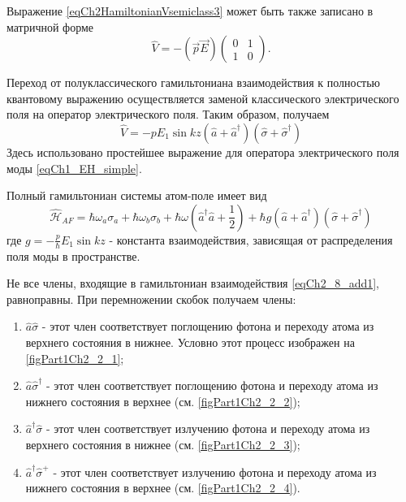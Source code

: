 Выражение \eqref{eqCh2HamiltonianVsemiclass3} может быть также
записано в матричной форме 
\begin{equation}
\hat{V} = - \left(\vec{p} \vec{E}\right)
\left(
\begin{array} {cc}
0 & 1  
\\
1 & 0 
\end{array}
\right).
\label{eqCh2_8}
\end{equation}

Переход от полуклассического гамильтониана взаимодействия к полностью
квантовому выражению осуществляется заменой классического
электрического поля на оператор электрического поля. Таким
образом, получаем 
\begin{equation}
\hat{V} = - p E_1 \sin k z \left(\hat{a} + \hat{a}^{\dag}\right)
\left(\hat{\sigma} + \hat{\sigma}^{\dag}\right)
\label{eqCh2_8_add1}
\end{equation}
Здесь использовано простейшее выражение для оператора электрического
поля моды \eqref{eqCh1_EH_simple}. 

Полный гамильтониан системы атом-поле имеет вид
\begin{equation}
\hat{\mathcal{H}}_{AF} = 
\hbar \omega_a \sigma_a + \hbar \omega_b \sigma_b +
\hbar \omega 
\left(\hat{a}^{\dag}\hat{a} + \frac{1}{2}\right)
+ \hbar g \left(\hat{a} + \hat{a}^{\dag}\right)
\left(\hat{\sigma} + \hat{\sigma}^{\dag}\right)
\nonumber
\end{equation}
где $g = -\frac{p}{\hbar}E_1 \sin k z$ - константа взаимодействия,
зависящая от распределения поля моды в пространстве.  










Не все члены, входящие в гамильтониан взаимодействия
\eqref{eqCh2_8_add1}, равноправны. При перемножении скобок получаем
члены: 
\begin{enumerate}
\item $\hat{a}\hat{\sigma}$ - этот член соответствует поглощению
  фотона и переходу атома из верхнего состояния в нижнее. Условно этот
  процесс изображен на \autoref{figPart1Ch2_2_1};  
\item $\hat{a}\hat{\sigma}^{\dag}$ - этот член соответствует поглощению
  фотона и переходу атома из нижнего состояния в верхнее (см. \autoref{figPart1Ch2_2_2});  
\item $\hat{a}^{\dag}\hat{\sigma}$ - этот член соответствует излучению
  фотона и переходу атома из верхнего состояния в нижнее (см. \autoref{figPart1Ch2_2_3}); 
\item $\hat{a}^{\dag}\hat{\sigma}^{+}$ - этот член соответствует
  излучению фотона и переходу атома из нижнего состояния в верхнее (см. \autoref{figPart1Ch2_2_4}). 
\end{enumerate}


